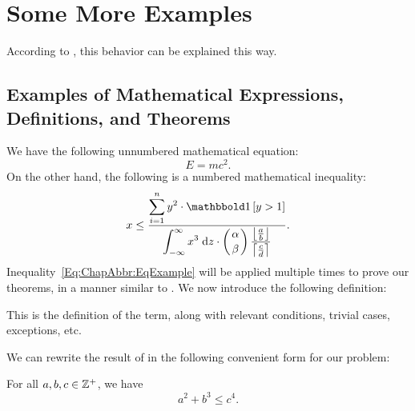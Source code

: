 
\section{Some More Examples}
\label{Section:ChapAbbr:SomeMoreExamples}

According to \cite{IEEEexample:book_typical}, this behavior can be explained this way.
\lipsum[12]


\subsection{Examples of Mathematical Expressions, Definitions, and Theorems}
\label{Section:ChapAbbr:SomeMoreExamples:Math}

We have the following unnumbered mathematical equation:
\[
E=mc^2.
\]
On the other hand, the following is a numbered mathematical inequality:
\begin{align}
x \leq
\frac{\displaystyle\sum_{i=1}^{n} y^2 \cdot \one{y > 1}}
{\displaystyle\int_{-\infty}^{\infty} x^3 \;\text{d}z \cdot
\binom{\alpha}{\beta} \frac{\floor{\frac{a}{b}}}{\ceil{\frac{c}{d}}}}.
\label{Eq:ChapAbbr:EqExample}
\end{align}
Inequality~\eqref{Eq:ChapAbbr:EqExample} will be applied multiple times to prove our theorems, in a manner similar to \cite{IEEEexample:article_typical, IEEEexample:conf_typical}.
We now introduce the following definition:

\begin{Thm:Definition}
This is the definition of the term, along with relevant conditions, trivial cases, exceptions, etc.
\end{Thm:Definition}

We can rewrite the result of \cite[Theorem~2.5]{IEEEexample:conf_typical} in the following convenient form for our problem:

\begin{Thm:Proposition}
For all \mbox{$a,b,c\in{\mathbb{Z}}^+$}, we have
\label{Thm:Proposition:ChapAbbr:PropositionExample}
\[
a^2+b^3\leq c^4.
\]
\end{Thm:Proposition}

